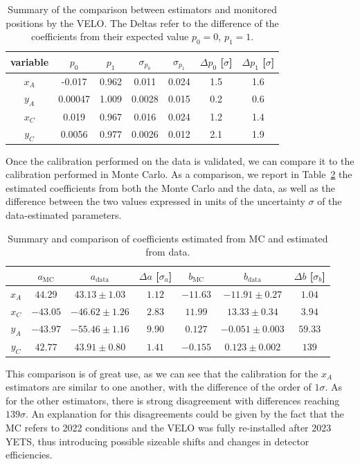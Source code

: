 \begin{table}
    \centering
    \begin{tabular}{c|c|c|c|c|c|c}
    variable  & $p_0$ & $p_1$ & $\sigma_{p_0}$ & $\sigma_{p_1}$ & $\Delta p_0$ [$\sigma$] & $\Delta p_1$ [$\sigma$]\\
    \hline
       $x_A$  & -0.017 & 0.962 & 0.011 & 0.024 & 1.5 & 1.6\\
       $y_A$  & 0.00047 & 1.009 & 0.0028 & 0.015 & 0.2 & 0.6 \\
       $x_C$ & 0.019 & 0.967 & 0.016 & 0.024 & 1.2 & 1.4\\
       $y_C$ & 0.0056 & 0.977 & 0.0026 & 0.012 & 2.1 & 1.9
    \end{tabular}
    \caption{Summary of the comparison between estimators and monitored positions by the VELO. The Deltas refer to the difference of the coefficients from their expected value $p_0=0$, $p_1=1$.}
    \label{tab:summary_velo}
\end{table}

Once the calibration performed on the data is validated, we can compare it to the calibration performed in Monte Carlo. As a comparison, we report in Table~\ref{tab:comparison_coeff} the estimated coefficients from both the Monte Carlo and the data, as well as the difference  between the two values expressed in units of the uncertainty $\sigma$ of the data-estimated parameters.

\begin{table}
\centering
\begin{tabular}{
c |
c |
c |
c |
c |
c |
c }
 & $a_{\text{MC}}$ & $a_{\text{data}}$ &  $\Delta a$ [$\sigma_a$] & $b_{\text{MC}}$ &  $b_{\text{data}}$ &  $\Delta b$ [$\sigma_b$] \\ \hline
    { $x_A$} &
  { $44.29$} &
  { $43.13\pm1.03$} &
  $1.12$ &%
  { $-11.63$} &
  { $-11.91\pm0.27$} &
  $1.04$\\%
    { $x_C$} &
  { $-43.05$} &
  { $-46.62\pm1.26$} &
  $2.83$&%
  { $11.99 $} &
  { $13.33\pm0.34$} &
  $3.94$\\%
    { $y_A$} &
  { $-43.97$} &
  { $-55.46\pm 1.16$} &
  $9.90$ &%
  { $0.127 $} &
  { $-0.051\pm0.003$} &
  $59.33$\\%
    { $y_C$} &
  { $42.77 $} &
  { $43.91\pm0.80 $} &
  $1.41$&%
  { $-0.155$} &
  { $0.123\pm0.002 $} &
  $139$%
\end{tabular}
\caption{Summary and comparison of coefficients estimated from MC and estimated from data. }\label{tab:comparison_coeff}
\end{table}
This comparison is of great use, as we can see that the calibration for the $x_A$ estimators are similar to one another, with the difference of the order of  $1\sigma$. As for the other estimators, there is strong disagreement with differences reaching $139\sigma$. An explanation for this disagreements could be given by the fact that the MC refers to 2022 conditions and the VELO was fully re-installed after 2023 YETS, thus introducing possible sizeable shifts and changes in detector efficiencies. 


